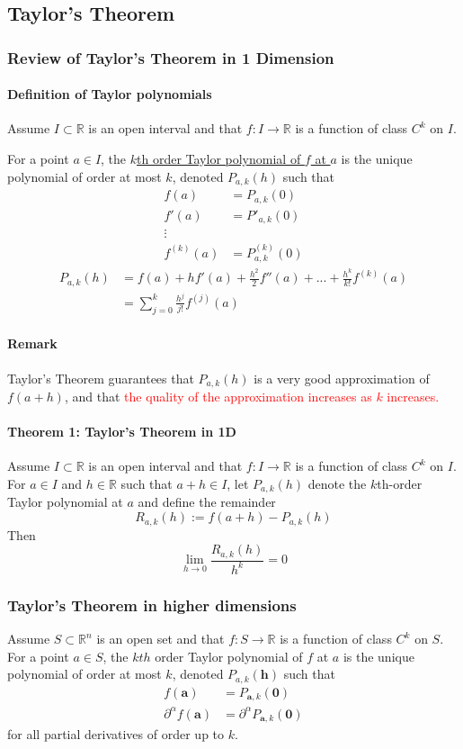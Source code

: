 \documentclass[11pt]{article}
\newcommand{\tb}[1]{\textbf{#1}}
\newcommand{\real}[0]{\mathbb{R}}
\newcommand{\under}[1]{\underline{#1}}
\begin{document}
\subsection{Taylor's Theorem}
\subsubsection{Review of Taylor's Theorem in 1 Dimension}
\paragraph{Definition of Taylor polynomials} Assume $I \subset \real$ is an open interval and that $f: I \rightarrow \real$ is a function of class $C^k$ on $I$.

For a point $a\in I$, the \under{$k$th order Taylor polynomial of $f$ at $a$} is the unique polynomial of order at most $k$, denoted $P_{a,k}(h)$ such that
\begin{align*}
    f(a) &= P_{a,k}(0)\\
    f'(a) &= P'_{a,k}(0)\\
    \vdots\\
    f^{(k)}(a) &= P_{a,k}^{(k)}(0)
\end{align*}
\begin{align*}
    P_{a,k}(h) &= f(a) + hf'(a) + \frac{h^2}{2}f''(a) +...+\frac{h^k}{k!}f^{(k)}(a)\\
    &= \sum_{j=0}^{k}\frac{h^j}{j!}f^{(j)}(a)
\end{align*}
\paragraph{Remark}
Taylor's Theorem guarantees that $P_{a,k}(h)$ is a very good approximation of $f(a+h)$, and that \textcolor{red}{the quality of the approximation increases as $k$ increases.}
\paragraph{Theorem 1: Taylor's Theorem in 1D}Assume $I \subset \real$ is an open interval and that $f: I \rightarrow \real$ is a function of class $C^k$ on $I$. For $a \in I$ and $h \in \real$ such that $a+h\in I$, let $P_{a,k}(h)$ denote the $k$th-order Taylor polynomial at $a$ and define the remainder
$$R_{a,k}(h) := f(a+h) - P_{a,k}(h)$$
Then $$\lim_{h\rightarrow0}\frac{R_{a,k}(h)}{h^k} = 0$$

\subsubsection{Taylor's Theorem in higher dimensions}
Assume $S \subset \real^n$ is an open set and that $f: S \rightarrow \real$ is a function of class $C^k$ on $S$. For a point $a\in S$, the $kth$ order Taylor polynomial of $f$ at $a$ is the unique polynomial of order at most $k$, denoted $P_{a,k}(\tb{h})$ such that
\begin{align*}
    f(\tb{a}) &= P_{\tb{a},k}(\tb{0}) \\
    \partial^\alpha f(\tb{a}) &= \partial^\alpha P_{\tb{a},k}(\tb{0})
\end{align*}
for all partial derivatives of order up to $k$.
\end{document}
